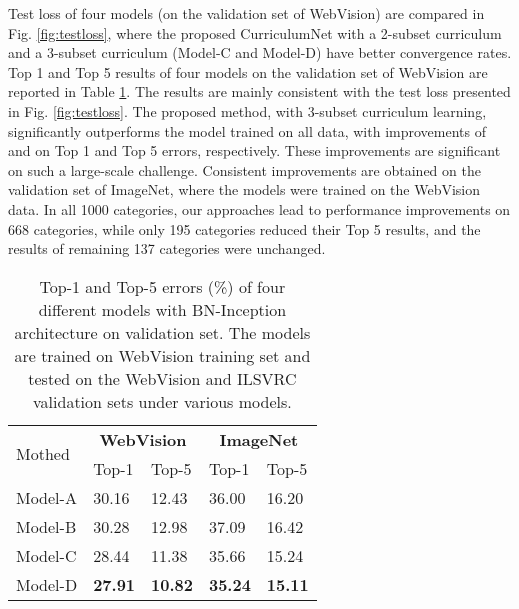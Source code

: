 \documentclass[runningheads]{llncs}
\begin{document}
Test loss of four models (on the validation set of WebVision) are compared in Fig. \ref{fig:testloss}, where the proposed CurriculumNet with a 2-subset curriculum and a 3-subset curriculum (Model-C and Model-D) have better convergence rates.
Top 1 and Top 5 results of four models on the validation set of WebVision are reported in Table \ref{tbl:test_model}. The results are mainly consistent with the test loss presented in Fig. \ref{fig:testloss}. The proposed method, with 3-subset curriculum learning, significantly outperforms the model trained on all data, with improvements of  and  on Top 1 and Top 5 errors, respectively. These improvements are significant on such a large-scale challenge. Consistent improvements are obtained on the validation set of ImageNet, where the models were trained on the WebVision data. In all 1000 categories, our approaches lead to performance improvements on 668 categories, while only 195 categories reduced their Top 5 results, and the results of remaining 137 categories were unchanged.










\begin{table}[tp]
\begin{center}
\caption{Top-1 and Top-5 errors (\%) of four different models with BN-Inception architecture on validation set. The models are trained on  WebVision training set and tested on the WebVision and ILSVRC validation sets under various models.}
\label{tbl:test_model}
\vspace{-2mm}
\begin{tabular}{p{1.8cm}|p{1.6cm}<{\centering}|p{1.6cm}<{\centering}|p{1.6cm}<{\centering}|p{1.6cm}<{\centering}}
  \hline
 \multirow{2}{*}{Mothed}& \multicolumn{2}{c}{\textbf{ WebVision}}&  \multicolumn{2}{c}{\textbf{ImageNet}} \\  \cline{2-5}
&Top-1&Top-5&Top-1&Top-5 \\
\hline
Model-A & 30.16 &  12.43 &36.00&16.20 \\
  \hline
  Model-B & 30.28& 12.98&37.09&16.42 \\
    \hline
  Model-C  & 28.44 & 11.38 &35.66&15.24 \\
  \hline
  Model-D  & {\bf27.91} &{\bf 10.82} &{\bf 35.24}& {\bf 15.11}  \\
  \hline
\end{tabular}


\end{center}
\end{table}
\end{document}
